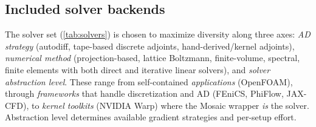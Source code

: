\subsection{Included solver backends}
\label{sec:solvers}

The solver set (\cref{tab:solvers}) is chosen to maximize diversity
along three axes: \emph{AD strategy} (autodiff, tape-based discrete
adjoints, hand-derived/kernel adjoints), \emph{numerical method} (projection-based, lattice Boltzmann,
finite-volume, spectral, finite elements with both direct and iterative
linear solvers), and \emph{solver abstraction level}.
These range from self-contained \emph{applications} (OpenFOAM),
through \emph{frameworks} that handle discretization and AD (FEniCS,
PhiFlow, JAX-CFD), to \emph{kernel toolkits} (NVIDIA Warp) where the
Mosaic wrapper \emph{is} the solver. Abstraction level determines
available gradient strategies and per-setup effort.


